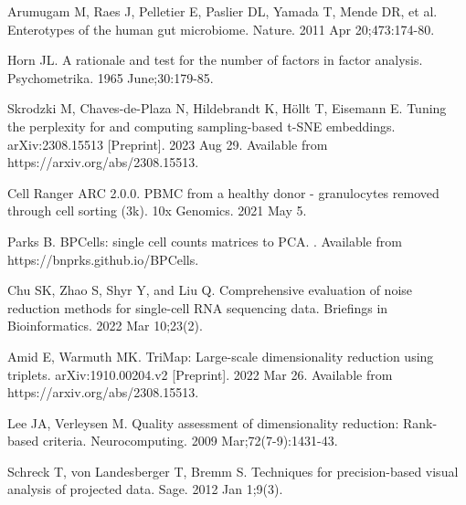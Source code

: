 \documentclass[10pt,letterpaper]{article}
\begin{document}
\begin{thebibliography}{10}
Arumugam M, Raes J, Pelletier E, Paslier DL, Yamada T, Mende DR, et al.
\newblock Enterotypes of the human gut microbiome.
\newblock Nature. 2011 Apr 20;473:174-80.

Horn JL.
\newblock A rationale and test for the number of factors in factor analysis.
\newblock Psychometrika. 1965 June;30:179-85.

Skrodzki M, Chaves-de-Plaza N, Hildebrandt K, H\"ollt T, Eisemann E.
\newblock Tuning the perplexity for and computing sampling-based t-SNE embeddings.
\newblock arXiv:2308.15513 [Preprint]. 2023 Aug 29. Available from https://arxiv.org/abs/2308.15513.

Cell Ranger ARC 2.0.0.
\newblock PBMC from a healthy donor - granulocytes removed through cell sorting (3k).
\newblock 10x Genomics. 2021 May 5.

Parks B.
\newblock BPCells: single cell counts matrices to PCA.
. Available from https://bnprks.github.io/BPCells.

Chu SK, Zhao S, Shyr Y, and Liu Q.
\newblock Comprehensive evaluation of noise reduction methods for single-cell RNA sequencing data.
\newblock Briefings in Bioinformatics. 2022 Mar 10;23(2).

Amid E, Warmuth MK. 
\newblock TriMap: Large-scale dimensionality reduction using triplets. 
\newblock arXiv:1910.00204.v2 [Preprint]. 2022 Mar 26. Available from https://arxiv.org/abs/2308.15513.

Lee JA, Verleysen M.
\newblock Quality assessment of dimensionality reduction: Rank-based criteria.
\newblock Neurocomputing. 2009 Mar;72(7-9):1431-43.

Schreck T, von Landesberger T, Bremm S.
\newblock Techniques for precision-based visual analysis of projected data.
\newblock Sage. 2012 Jan 1;9(3).

\end{thebibliography}
\end{document}
